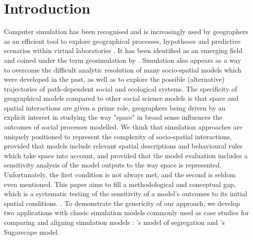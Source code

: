 \documentclass{JASSS}
\begin{document}
%




\section{Introduction}

Computer simulation has been recognised and is increasingly used by geographers as an efficient tool to explore geographical processes, hypotheses and predictive scenarios within virtual laboratories \citep{batty1971modelling, batty2007model, carley1999generating, Quesneletal2009}. It has been identified as an emerging field and coined under the term geosimulation by \cite{benenson2004geosimulation}. Simulation also appears as a way to overcome the difficult analytic resolution of many socio-spatial models which were developed in the past, as well as to explore the possible (alternative) trajectories of path-dependent social and ecological systems. The specificity of geographical models compared to other social science models is that space and spatial interactions are given a prime role, geographers being driven by an explicit interest in studying the way "space" in broad sense influences the outcomes of social processes modelled. We think that simulation approaches are uniquely positioned to represent the complexity of socio-spatial interactions, provided that models include relevant spatial descriptions and behavioural rules which take space into account, and provided that the model evaluation includes a sensitivity analysis of the model outputs to the way space is represented. Unfortunately, the first condition is not always met, and the second is seldom even mentioned. This paper aims to fill a methodological and conceptual gap, which is a systematic testing of the sensitivity of a model's outcomes to its initial spatial conditions. . To demonstrate the genericity of our approach, we develop two applications with classic simulation models commonly used as case studies for comparing and aligning simulation models \citep{Axtelletal1996, wilensky2007making}: \citet{schelling1971dynamic}'s model of segregation and \citet{EpsteinAxtell1996}'s Sugarscape model.\\
\end{document}
